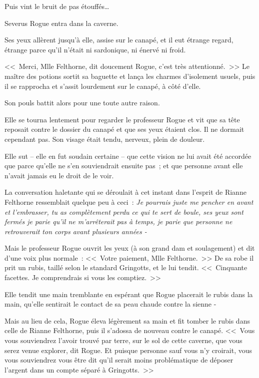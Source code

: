Puis vint le bruit de pas étouffés…

Severus Rogue entra dans la caverne.

Ses yeux allèrent jusqu'à elle, assise sur le canapé, et il eut étrange regard, étrange parce qu'il n'était ni sardonique, ni énervé ni froid.

<<~Merci, Mlle Felthorne, dit doucement Rogue, c'est très attentionné.~>> Le maître des potions sortit sa baguette et lança les charmes d'isolement usuels, puis il se rapprocha et s'assit lourdement sur le canapé, à côté d'elle.

Son pouls battit alors pour une toute autre raison.

Elle se tourna lentement pour regarder le professeur Rogue et vit que sa tête reposait contre le dossier du canapé et que ses yeux étaient clos. Il ne dormait cependant pas. Son visage était tendu, nerveux, plein de douleur.

Elle sut -- elle en fut soudain certaine -- que cette vision ne lui avait été accordée que parce qu'elle ne s'en souviendrait ensuite pas~; et que personne avant elle n'avait jamais eu le droit de le voir.

La conversation haletante qui se déroulait à cet instant dans l'esprit de Rianne Felthorne ressemblait quelque peu à ceci~: \emph{Je pourrais juste me pencher en avant et l'embrasser, tu as complètement perdu ce qui te sert de boule, ses yeux sont fermés je parie qu'il ne m'arrêterait pas à temps, je parie que personne ne retrouverait ton corps avant plusieurs années -}

Mais le professeur Rogue ouvrit les yeux (à son grand dam et soulagement) et dit d'une voix plus normale~: <<~Votre paiement, Mlle Felthorne.~>> De sa robe il prit un rubis, taillé selon le standard Gringotts, et le lui tendit. <<~Cinquante facettes. Je comprendrais si vous les comptiez.~>>

Elle tendit une main tremblante en espérant que Rogue placerait le rubis dans la main, qu'elle sentirait le contact de sa peau chaude contre la sienne -

Mais au lieu de cela, Rogue éleva légèrement sa main et fit tomber le rubis dans celle de Rianne Felthorne, puis il s'adossa de nouveau contre le canapé. <<~Vous vous souviendrez l'avoir trouvé par terre, sur le sol de cette caverne, que vous serez venue explorer, dit Rogue. Et puisque personne sauf vous n'y croirait, vous vous souviendrez vous être dit qu'il serait moins problématique de déposer l'argent dans un compte séparé à Gringotts.~>>

